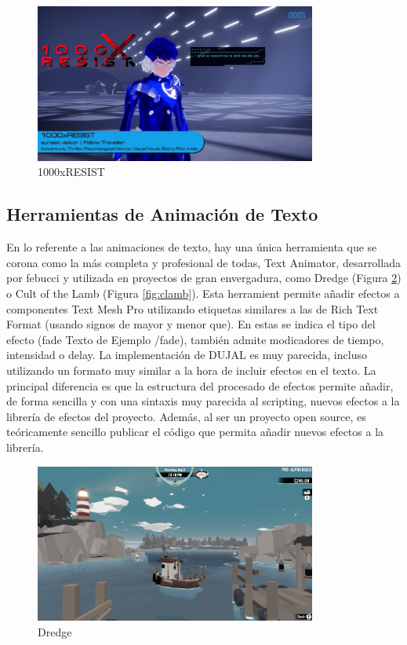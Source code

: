 \begin{figure}[H]
  \centering
  \includegraphics[width=350px,clip=true]{100xresist.png}
  \caption{1000xRESIST}
  \label{fig:1000xResist}
\end{figure}

 \subsection{Herramientas de Animación de Texto}
En lo referente a las animaciones de texto, hay una única herramienta que se corona como la más completa y profesional de todas, Text Animator\cite{TextAnimator}, desarrollada por febucci y utilizada en proyectos
 de gran envergadura, como Dredge (Figura \ref{fig:dredge}) o Cult of the Lamb (Figura \ref{fig:clamb}). Esta herramient permite añadir efectos a componentes Text Mesh Pro utilizando etiquetas similares a las de 
 Rich Text Format (usando signos de mayor y menor que). En estas se indica el tipo del efecto (fade Texto de Ejemplo /fade), también admite modicadores de tiempo, intensidad o delay. La implementación de DUJAL es muy parecida, incluso utilizando 
 un formato muy similar a la hora de incluir efectos en el texto. La principal diferencia es que la estructura del procesado de efectos permite añadir, de forma sencilla y con una sintaxis muy parecida al scripting, 
 nuevos efectos a la librería de efectos del proyecto. Además, al ser un proyecto open source, es teóricamente sencillo publicar el código que permita añadir nuevos efectos a la librería.

\begin{figure}[H]
  \centering
  \includegraphics[width=350px,clip=true]{dredge.png}
  \caption{Dredge}
  \label{fig:dredge}
\end{figure}

